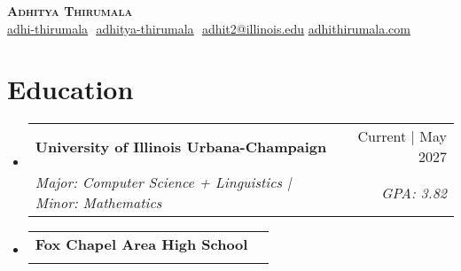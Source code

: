 \documentclass{article}
\makeatletter
\newcommand{\resumeSubheading}[4]{
  \vspace{-2pt}\item
    \begin{tabular*}{0.97\textwidth}[t]{l@{\extracolsep{\fill}}r}
      \textbf{#1} & #2 \\
      \textit{\small#3} & \textit{\small #4} \\
    \end{tabular*}\vspace{-7pt}
}
\newcommand{\resumeSubHeadingListStart}{\begin{itemize}[leftmargin=0.15in, label={}]}
\newcommand{\resumeSubHeadingListEnd}{\end{itemize}}
\makeatother
\begin{document}
\begin{flushright}
	\vspace{-4pt}
	\color{gray}
\end{flushright}

\vspace{-7pt}

\begin{center}
	\textbf{{\Huge\scshape Adhitya Thirumala}} \\ \vspace{8pt}
	\small
	\href{https://github.com/adhi-thirumala}{\underline{adhi-thirumala}} $  $
	\href{https://www.linkedin.com/in/adhitya-thirumala}
	{\underline{adhitya-thirumala}} $  $
	\href{mailto:adhit2@illinois.edu}
	{\underline{adhit2@illinois.edu}}
	\href{https://www.adhithirumala.com}
	{\underline{adhithirumala.com}} $  $
   $  $



\end{center}

\section{Education}
\resumeSubHeadingListStart

\resumeSubheading{University of Illinois Urbana-Champaign} {Current | May 2027} {Major: Computer Science + Linguistics | Minor: Mathematics}{GPA: 3.82}
\vspace{1pt}

\resumeSubheading
{Fox Chapel Area High School}{}
{}{}
\resumeSubHeadingListEnd
\vspace{-15pt}


\end{document}
